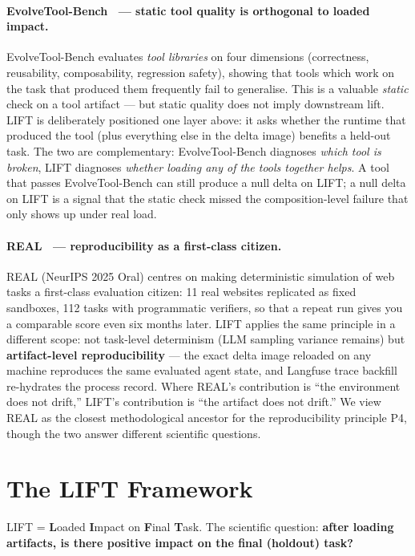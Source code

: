 \documentclass{article}
\begin{document}
\paragraph{EvolveTool-Bench~\citep{kaliyev2026evolvetoolbench} --- static tool quality is orthogonal to loaded impact.} EvolveTool-Bench evaluates \emph{tool libraries} on four dimensions (correctness, reusability, composability, regression safety), showing that tools which work on the task that produced them frequently fail to generalise. This is a valuable \emph{static} check on a tool artifact --- but static quality does not imply downstream lift. LIFT is deliberately positioned one layer above: it asks whether the runtime that produced the tool (plus everything else in the delta image) benefits a held-out task. The two are complementary: EvolveTool-Bench diagnoses \emph{which tool is broken}, LIFT diagnoses \emph{whether loading any of the tools together helps}. A tool that passes EvolveTool-Bench can still produce a null delta on LIFT; a null delta on LIFT is a signal that the static check missed the composition-level failure that only shows up under real load.

\paragraph{REAL~\citep{garg2025real} --- reproducibility as a first-class citizen.} REAL (NeurIPS 2025 Oral) centres on making deterministic simulation of web tasks a first-class evaluation citizen: 11 real websites replicated as fixed sandboxes, 112 tasks with programmatic verifiers, so that a repeat run gives you a comparable score even six months later. LIFT applies the same principle in a different scope: not task-level determinism (LLM sampling variance remains) but \textbf{artifact-level reproducibility} --- the exact delta image reloaded on any machine reproduces the same evaluated agent state, and Langfuse trace backfill re-hydrates the process record. Where REAL's contribution is ``the environment does not drift,'' LIFT's contribution is ``the artifact does not drift.'' We view REAL as the closest methodological ancestor for the reproducibility principle P4, though the two answer different scientific questions.


\section{The LIFT Framework}

LIFT = \textbf{L}oaded \textbf{I}mpact on \textbf{F}inal \textbf{T}ask. The scientific question: \textbf{after loading artifacts, is there positive impact on the final (holdout) task?}
\end{document}
